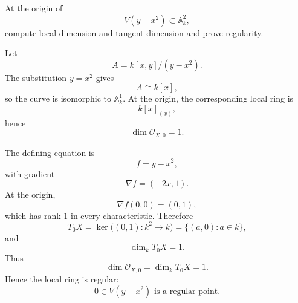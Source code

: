 \begin{problem}\label{prob:vi32-06}
At the origin of
\[
V(y-x^2)\subset\mathbb A^2_k,
\]
compute local dimension and tangent dimension and prove regularity.

\end{problem}

\ifdefined\FullProblemDossiers
\begin{solution}
Let
\[
A=k[x,y]/(y-x^2).
\]
The substitution \(y=x^2\) gives
\[
A\cong k[x],
\]
so the curve is isomorphic to \(\mathbb A^1_k\). At the origin, the corresponding local ring is
\[
k[x]_{(x)},
\]
hence
\[
\dim\mathcal O_{X,0}=1.
\]

The defining equation is
\[
f=y-x^2,
\]
with gradient
\[
\nabla f=(-2x,1).
\]
At the origin,
\[
\nabla f(0,0)=(0,1),
\]
which has rank \(1\) in every characteristic. Therefore
\[
T_0X
=
\ker\bigl((0,1):k^2\to k\bigr)
=
\{(a,0):a\in k\},
\]
and
\[
\dim_kT_0X=1.
\]
Thus
\[
\dim\mathcal O_{X,0}
=
\dim_kT_0X
=
1.
\]
Hence the local ring is regular:
\[
\boxed{0\in V(y-x^2)\text{ is a regular point}.}
\]
\end{solution}
\fi
